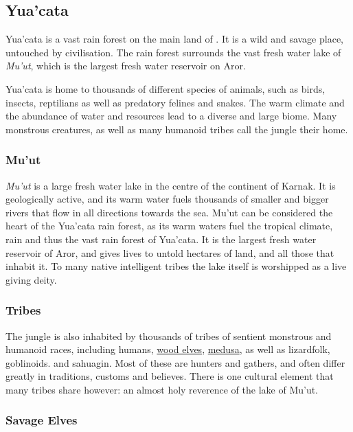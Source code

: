 \subsection{Yua'cata}
\label{sec:Yuacata}

Yua'cata is a vast rain forest on the main land of . It is a
wild and savage place, untouched by civilisation. The rain forest surrounds
the vast fresh water lake of \emph{Mu'ut}, which is the largest fresh water
reservoir on Aror.

Yua'cata is home to thousands of different species of animals, such as birds,
insects, reptilians as well as predatory felines and snakes. The warm climate
and the abundance of water and resources lead to a diverse and large biome. Many
monstrous creatures, as well as many humanoid tribes call the jungle their
home.

\subsubsection{Mu'ut}
\label{sec:Muut}

\emph{Mu'ut} is a large fresh water lake in the centre of the continent of
Karnak. It is geologically active, and its warm water fuels thousands of
smaller and bigger rivers that flow in all directions towards the sea. Mu'ut
can be considered the heart of the Yua'cata rain forest, as its warm waters
fuel the tropical climate, rain and thus the vast rain forest of Yua'cata.
It is the largest fresh water reservoir of Aror, and gives lives to untold
hectares of land, and all those that inhabit it. To many native intelligent
tribes the lake itself is worshipped as a live giving deity.

\subsubsection{Tribes}

The jungle is also inhabited by thousands of tribes of sentient monstrous and
humanoid races, including humans, \hyperref[sec:Wood Elves]{wood elves},
\hyperref[sec:Medusa]{medusa}, as well as lizardfolk, goblinoids. and
sahuagin. Most of these are hunters and gathers, and often differ greatly in
traditions, customs and believes. There is one cultural element that many
tribes share however: an almost holy reverence of the lake of Mu'ut.

\subsubsection{Savage Elves}
\label{sec:Savage Elves}

